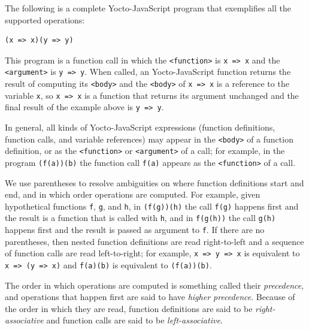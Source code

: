 \documentclass[12pt, oneside]{book}
\begin{document}
The following is a complete Yocto-JavaScript program that exemplifies all the supported operations:

\begin{verbatim}
(x => x)(y => y)
\end{verbatim}

This program is a function call in which the \texttt{<function>} is \texttt{x => x} and the \texttt{<argument>} is \texttt{y => y}. When called, an Yocto-JavaScript function returns the result of computing its \texttt{<body>} and the \texttt{<body>} of \texttt{x => x} is a reference to the variable \texttt{x}, so \texttt{x => x} is a function that returns its argument unchanged and the final result of the example above is \texttt{y => y}.

In general, all kinds of Yocto-JavaScript expressions (function definitions, function calls, and variable references) may appear in the \texttt{<body>} of a function definition, or as the \texttt{<function>} or \texttt{<argument>} of a call; for example, in the program \texttt{(f(a))(b)} the function call \texttt{f(a)} appears as the \texttt{<function>} of a call.

We use parentheses to resolve ambiguities on where function definitions start and end, and in which order operations are computed. For example, given hypothetical functions \texttt{f}, \texttt{g}, and \texttt{h}, in \texttt{(f(g))(h)} the call \texttt{f(g)} happens first and the result is a function that is called with \texttt{h}, and in \texttt{f(g(h))} the call \texttt{g(h)} happens first and the result is passed as argument to \texttt{f}. If there are no parentheses, then nested function definitions are read right-to-left and a sequence of function calls are read left-to-right; for example, \texttt{x => y => x} is equivalent to \texttt{x => (y => x)} and \texttt{f(a)(b)} is equivalent to \texttt{(f(a))(b)}.

\begin{mdframed}[frametitle = {Technical Terms}]
The order in which operations are computed is something called their \emph{precedence}, and operations that happen first are said to have \emph{higher precedence}. Because of the order in which they are read, function definitions are said to be \emph{right-associative} and function calls are said to be \emph{left-associative}.
\end{mdframed}
\end{document}
